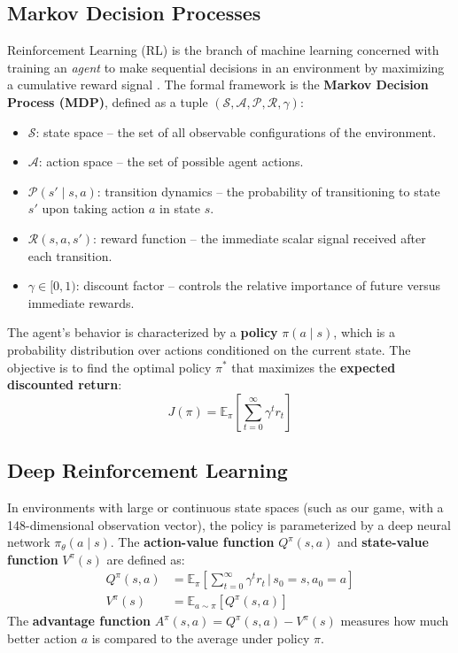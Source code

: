 \subsection{Markov Decision Processes}

Reinforcement Learning (RL) is the branch of machine learning concerned with training an \textit{agent} to make sequential decisions in an environment by maximizing a cumulative reward signal \cite{sutton2018reinforcement}. The formal framework is the \textbf{Markov Decision Process (MDP)}, defined as a tuple $(\mathcal{S}, \mathcal{A}, \mathcal{P}, \mathcal{R}, \gamma)$:
\begin{itemize}
    \item $\mathcal{S}$: state space -- the set of all observable configurations of the environment.
    \item $\mathcal{A}$: action space -- the set of possible agent actions.
    \item $\mathcal{P}(s' \mid s, a)$: transition dynamics -- the probability of transitioning to state $s'$ upon taking action $a$ in state $s$.
    \item $\mathcal{R}(s, a, s')$: reward function -- the immediate scalar signal received after each transition.
    \item $\gamma \in [0, 1)$: discount factor -- controls the relative importance of future versus immediate rewards.
\end{itemize}

The agent's behavior is characterized by a \textbf{policy} $\pi(a \mid s)$, which is a probability distribution over actions conditioned on the current state. The objective is to find the optimal policy $\pi^*$ that maximizes the \textbf{expected discounted return}:
\begin{equation}
J(\pi) = \mathbb{E}_\pi \left[ \sum_{t=0}^{\infty} \gamma^t r_t \right]
\end{equation}

\subsection{Deep Reinforcement Learning}

In environments with large or continuous state spaces (such as our game, with a 148-dimensional observation vector), the policy is parameterized by a deep neural network $\pi_\theta(a \mid s)$. The \textbf{action-value function} $Q^\pi(s, a)$ and \textbf{state-value function} $V^\pi(s)$ are defined as:
\begin{align}
Q^\pi(s, a) &= \mathbb{E}_\pi \left[ \sum_{t=0}^{\infty} \gamma^t r_t \,\Big|\, s_0=s, a_0=a \right] \\
V^\pi(s) &= \mathbb{E}_{a \sim \pi} \left[ Q^\pi(s, a) \right]
\end{align}
The \textbf{advantage function} $A^\pi(s, a) = Q^\pi(s, a) - V^\pi(s)$ measures how much better action $a$ is compared to the average under policy $\pi$.

